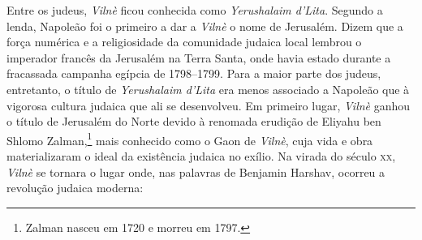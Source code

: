 Entre os judeus, \textit{Vilnè} ficou conhecida como \textit{Yerushalaim
d'Lita}. Segundo a lenda, Napoleão foi o
primeiro a dar a \textit{Vilnè} o nome de Jerusalém. Dizem que a força numérica e
a religiosidade da comunidade judaica local lembrou o imperador francês
da Jerusalém na Terra Santa, onde havia estado durante a fracassada
campanha egípcia de 1798--1799. Para a maior parte dos judeus,
entretanto, o título de \textit{Yerushalaim d'Lita} era menos associado a
Napoleão que à vigorosa cultura judaica que ali se desenvolveu. Em
primeiro lugar, \textit{Vilnè} ganhou o título de Jerusalém do Norte devido à
renomada erudição de Eliyahu ben Shlomo Zalman,\footnote{Zalman nasceu em 1720 e morreu em 1797.} mais
conhecido como o Gaon de \textit{Vilnè}, cuja vida e obra materializaram o ideal
da existência judaica no exílio. Na virada do século \textsc{xx}, \textit{Vilnè} se
tornara o lugar onde, nas palavras de Benjamin Harshav, ocorreu a
revolução judaica moderna:

